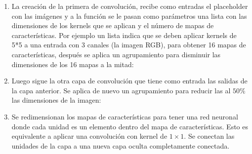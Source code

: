 \begin{enumerate}

\item La creación de la primera de convolución, recibe como entradas el placeholder
con las imágenes y a la función se le pasan como parámetros una lista con las dimensiones
de los kernels que se aplican y el número de mapas de características. Por ejemplo
un lista \sphinxcode{\sphinxupquote{{[}5, 5, 3, 16{]}}} indica que se deben aplicar kernels de 5*5 a
una entrada con 3 canales (la imagen RGB), para obtener
16 mapas de características, después se aplica un agrupamiento para disminuir las
dimensiones de los 16 mapas a la mitad:

%
\begin{sphinxVerbatim}[commandchars=\\\{\}]
   
  
\end{sphinxVerbatim}

\item Luego sigue la otra capa de convolución que tiene como entrada las salidas
de la capa anterior. Se aplica de nuevo un agrupamiento para reducir las al $50\%$ las
dimensiones de la imagen:

%
\begin{sphinxVerbatim}[commandchars=\\\{\}]
   
  
\end{sphinxVerbatim}

\item Se redimensionan los
mapas de características para tener una red neuronal donde cada unidad es un
elemento dentro del mapa de características. Esto es equivalente a aplicar
una convolución con kernel de $1 \times 1$. 
Se conectan las unidades de la capa a una nueva capa oculta
completamente conectada.

%
\begin{sphinxVerbatim}[commandchars=\\\{\}]
   \PYG{p}{[}     \PYG{p}{]}
   
\end{sphinxVerbatim}


\end{enumerate}
